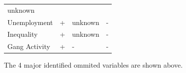 \documentclass[]{article}
\begin{document}
\begin{longtable}[]{@{}llll@{}}
\begin{minipage}[t]{0.20\columnwidth}
unknown\strut
\end{minipage}\tabularnewline
\begin{minipage}[t]{0.18\columnwidth}\raggedright
Unemployment\strut
\end{minipage} & \begin{minipage}[t]{0.19\columnwidth}\raggedright
+\strut
\end{minipage} & \begin{minipage}[t]{0.31\columnwidth}\raggedright
unknown\strut
\end{minipage} & \begin{minipage}[t]{0.20\columnwidth}\raggedright
-\strut
\end{minipage}\tabularnewline
\begin{minipage}[t]{0.18\columnwidth}\raggedright
Inequality\strut
\end{minipage} & \begin{minipage}[t]{0.19\columnwidth}\raggedright
+\strut
\end{minipage} & \begin{minipage}[t]{0.31\columnwidth}\raggedright
unknown\strut
\end{minipage} & \begin{minipage}[t]{0.20\columnwidth}\raggedright
-\strut
\end{minipage}\tabularnewline
\begin{minipage}[t]{0.18\columnwidth}\raggedright
Gang Activity\strut
\end{minipage} & \begin{minipage}[t]{0.19\columnwidth}\raggedright
+\strut
\end{minipage} & \begin{minipage}[t]{0.31\columnwidth}\raggedright
-\strut
\end{minipage} & \begin{minipage}[t]{0.20\columnwidth}\raggedright
-\strut
\end{minipage}\tabularnewline
\bottomrule
\end{longtable}

The 4 major identified ommited variables are shown above.
\end{document}

